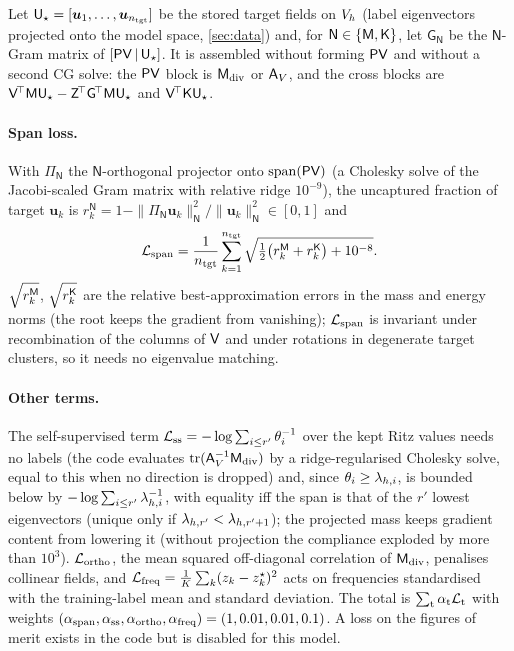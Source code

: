 Let $\mathsf U_\star=[\bm u_1,\dots,\bm u_{n_{\rm tgt}}]$ be the stored target fields on $V_h$ (label eigenvectors projected onto the model space, \cref{sec:data}) and, for $\mathsf N\in\{\mathsf{M},\mathsf{K}\}$, let $\mathsf G_{\mathsf N}$ be the $\mathsf N$-Gram matrix of $[\mathsf{P}\mathsf{V}\,|\,\mathsf U_\star]$.
It is assembled without forming $\mathsf{P}\mathsf{V}$ and without a second CG solve: the $\mathsf{P}\mathsf{V}$ block is $\Mdiv$ or $\Av$, and the cross blocks are $\mathsf{V}^{\!\top}\mathsf{M}\mathsf U_\star-\mathsf Z^{\!\top}\mathsf{G}^{\!\top}\mathsf{M}\mathsf U_\star$ and $\mathsf{V}^{\!\top}\mathsf{K}\mathsf U_\star$.

\paragraph{Span loss.}
With $\Pi_{\mathsf N}$ the $\mathsf N$-orthogonal projector onto $\operatorname{span}(\mathsf{P}\mathsf{V})$ (a Cholesky solve of the Jacobi-scaled Gram matrix with relative ridge $10^{-9}$), the uncaptured fraction of target $\bm u_k$ is $r_k^{\mathsf N}=1-\|\Pi_{\mathsf N}\bm u_k\|_{\mathsf N}^2/\|\bm u_k\|_{\mathsf N}^2\in[0,1]$ and
\begin{equation}\label{eq:04-span}
  \mathcal L_{\rm span}=\frac1{n_{\rm tgt}}\sum_{k=1}^{n_{\rm tgt}}\sqrt{\tfrac12\big(r_k^{\mathsf{M}}+r_k^{\mathsf{K}}\big)+10^{-8}}.
\end{equation}
$\sqrt{r_k^{\mathsf{M}}}$, $\sqrt{r_k^{\mathsf{K}}}$ are the relative best-approximation errors in the mass and energy norms (the root keeps the gradient from vanishing); $\mathcal L_{\rm span}$ is invariant under recombination of the columns of $\mathsf{V}$ and under rotations in degenerate target clusters, so it needs no eigenvalue matching.

\paragraph{Other terms.}
The self-supervised term $\mathcal L_{\rm ss}=-\log\sum_{i\le r'}\theta_i^{-1}$ over the kept Ritz values needs no labels (the code evaluates $\mathrm{tr}(\Av^{-1}\Mdiv)$ by a ridge-regularised Cholesky solve, equal to this when no direction is dropped) and, since $\theta_i\ge\lamh_i$, is bounded below by $-\log\sum_{i\le r'}\lamh_i^{-1}$, with equality iff the span is that of the $r'$ lowest eigenvectors (unique only if $\lamh_{r'}<\lamh_{r'+1}$); the projected mass keeps gradient content from lowering it (without projection the compliance exploded by more than $10^3$).
$\mathcal L_{\rm ortho}$, the mean squared off-diagonal correlation of $\Mdiv$, penalises collinear fields, and $\mathcal L_{\rm freq}=\frac1K\sum_k(z_k-z_k^\star)^2$ acts on frequencies standardised with the training-label mean and standard deviation.
The total is $\sum_{\rm t}\alpha_{\rm t}\mathcal L_{\rm t}$ with weights $(\alpha_{\rm span},\alpha_{\rm ss},\alpha_{\rm ortho},\alpha_{\rm freq})=(1,0.01,0.01,0.1)$.
A loss on the figures of merit exists in the code but is disabled for this model.

